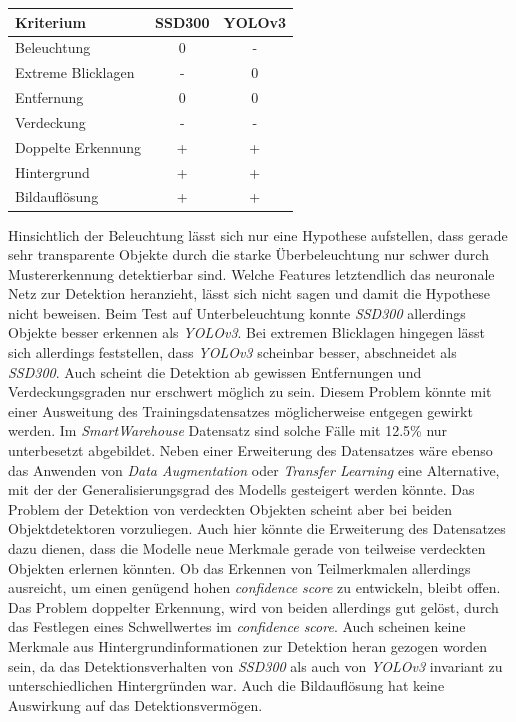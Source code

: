 \begin{center}
	\begin{tabular}[h]{l|c|c}
		Kriterium & SSD300 & YOLOv3 \\
		\hline
		Beleuchtung & 0 & - \\
		Extreme Blicklagen & - & 0 \\
		Entfernung & 0 & 0 \\
		Verdeckung & - & - \\
		Doppelte Erkennung & + & + \\
		Hintergrund & + & + \\
		Bildauflösung & + & + \\
	\end{tabular}
	\label{table:inference}
\end{center}

Hinsichtlich der Beleuchtung lässt sich nur eine Hypothese aufstellen, dass gerade sehr transparente Objekte durch die starke Überbeleuchtung nur schwer durch Mustererkennung detektierbar sind. Welche Features letztendlich das neuronale Netz zur Detektion heranzieht, lässt sich nicht sagen und damit die Hypothese nicht beweisen. Beim Test auf Unterbeleuchtung konnte \textit{SSD300} allerdings Objekte besser erkennen als \textit{YOLOv3}. Bei extremen Blicklagen hingegen lässt sich allerdings feststellen, dass \textit{YOLOv3} scheinbar besser, abschneidet als \textit{SSD300}. Auch scheint die Detektion ab gewissen Entfernungen und Verdeckungsgraden nur erschwert möglich zu sein. Diesem Problem könnte mit einer Ausweitung des Trainingsdatensatzes möglicherweise entgegen gewirkt werden. Im \textit{SmartWarehouse} Datensatz sind solche Fälle mit 12.5\% nur unterbesetzt abgebildet. Neben einer Erweiterung des Datensatzes wäre ebenso das Anwenden von \textit{Data Augmentation} oder \textit{Transfer Learning} eine Alternative, mit der der Generalisierungsgrad des Modells gesteigert werden könnte. Das Problem der Detektion von verdeckten Objekten scheint aber bei beiden Objektdetektoren vorzuliegen. Auch hier könnte die Erweiterung des Datensatzes dazu dienen, dass die Modelle neue Merkmale gerade von teilweise verdeckten Objekten erlernen könnten. Ob das Erkennen von Teilmerkmalen allerdings ausreicht, um einen genügend hohen \textit{confidence score} zu entwickeln, bleibt offen. Das Problem doppelter Erkennung, wird von beiden allerdings gut gelöst, durch das Festlegen eines Schwellwertes im \textit{confidence score}. Auch scheinen keine Merkmale aus Hintergrundinformationen zur Detektion heran gezogen worden sein, da das Detektionsverhalten von \textit{SSD300} als auch von \textit{YOLOv3} invariant zu unterschiedlichen Hintergründen war. Auch die Bildauflösung hat keine Auswirkung auf das Detektionsvermögen.

